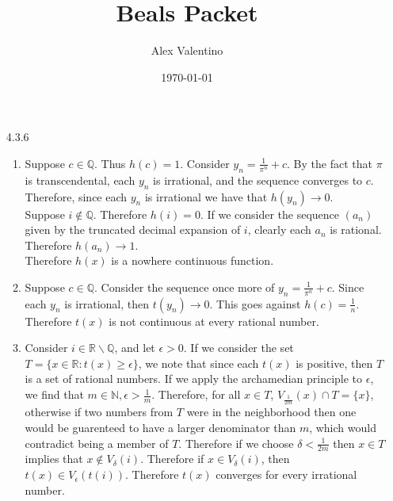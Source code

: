 \documentclass[12pt, letterpaper]{article}
\date{\today}
\author{Alex Valentino}
\title{Beals Packet}
\newcommand{\N}{\mathbb{N}}
\newcommand{\R}{\mathbb{R}}
\newcommand{\Q}{\mathbb{Q}}
\begin{document}
\begin{enumerate}
	\item[4.3.6] 
	\begin{enumerate}
		\item Suppose $c \in \Q$.  Thus $h(c) = 1$.  Consider $y_n = \frac{1}{\pi^n} + c$.  By the fact that $\pi$ is transcendental, each $y_n$ is irrational, and the sequence converges to $c$.  
		Therefore, since each $y_n$ is irrational we have that $h(y_n) \to 0$.  \\
		Suppose $i \not \in \Q$.  Therefore $h(i) = 0$.  If we consider the 
		sequence $(a_n)$ given by the truncated decimal expansion of $i$,
		clearly each $a_n$ is rational.  Therefore $h(a_n) \to 1$.\\
		Therefore $h(x)$ is a nowhere continuous function.
		\item Suppose $c \in \Q$.  Consider the sequence once more of 
		$y_n = \frac{1}{\pi^n} + c$.  Since each $y_n$ is irrational, then $t(y_n) \to 0$. This goes against $h(c) = \frac{1}{n}$. Therefore $t(x)$ is not continuous at every rational number.
		\item Consider $i \in \R \backslash \Q$, and let $\epsilon > 0$.  If we consider the set 
		$T = \{x \in \R: t(x) \geq \epsilon\}$, we note that since each $t(x)$ is positive, then $T$ is a set of rational numbers.  If we apply the archamedian principle to $\epsilon$, we find that $m \in \N, \epsilon > \frac{1}{m}$.  Therefore, for all $x \in T$, $V_{\frac{1}{2m}}(x) \cap T = \{x\}$, otherwise if two numbers from $T$ were in the neighborhood then one would be guarenteed to have a larger denominator than $m$, which would contradict being a member of $T$.  Therefore if we choose $\delta < \frac{1}{2m}$ then $x \in T$ implies that $x \not \in V_{\delta}(i)$.  Therefore if $x \in V_{\delta}(i)$, then $t(x) \in V_\epsilon (t(i))$.  Therefore $t(x)$ converges for every irrational number. 
	\end{enumerate}
\end{enumerate}
\end{document}
